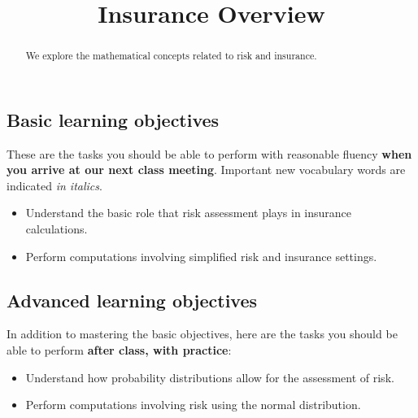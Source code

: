 \documentclass{ximera}
\title{Insurance Overview}
\begin{document}
\begin{abstract}
We explore the mathematical concepts related to risk and insurance.
\end{abstract}
\maketitle

\subsection*{Basic learning objectives}

These are the tasks you should be able to perform with reasonable fluency \textbf{when you arrive at our next class meeting}. Important new vocabulary words are indicated \emph{in italics}. 

\begin{itemize}
	\item Understand the basic role that risk assessment plays in insurance calculations.
    \item Perform computations involving simplified risk and insurance settings.
\end{itemize}

\subsection*{Advanced learning objectives}

In addition to mastering the basic objectives, here are the tasks you should be able to perform \textbf{after class, with practice}: 

\begin{itemize}
	\item Understand how probability distributions allow for the assessment of risk.
    \item Perform computations involving risk using the normal distribution.
\end{itemize}
\end{document}
